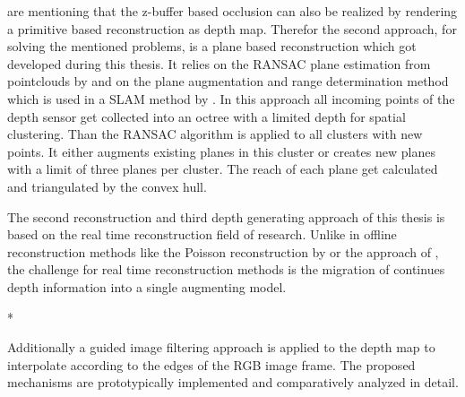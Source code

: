 \documentclass[12pt]{support/thcolognereport}
\begin{document}
\citet{breen1996interactive} are mentioning that the z-buffer based occlusion can also be realized by rendering a primitive based reconstruction as depth map. Therefor the second approach, for solving the mentioned problems, is a plane based reconstruction which got developed during this thesis. It relies on the RANSAC plane estimation from pointclouds by \citet{yang2010plane} and on the plane augmentation and range determination method which is used in a SLAM method by \citet{trevor2012planar}. In this approach all incoming points of the depth sensor get collected into an octree with a limited depth for spatial clustering. Than the RANSAC algorithm is applied to all clusters with new points. It either augments existing planes in this cluster or creates new planes with a limit of three planes per cluster. The reach of each plane get calculated and triangulated by the convex hull. 

The second reconstruction and third depth generating approach of this thesis is based on the real time reconstruction field of research. Unlike in offline reconstruction methods like the Poisson reconstruction by \citet{kazhdan2006poisson} or the approach of \citet{hoppe1992surface}, the challenge for real time reconstruction methods is the migration of continues depth information into a single augmenting model. 


* 


Additionally a guided image filtering approach is applied to the depth map to interpolate according to the edges of the RGB image frame. The proposed mechanisms are prototypically implemented and comparatively analyzed in detail.


\setlength{\parskip}{0em}



 
\end{document}
